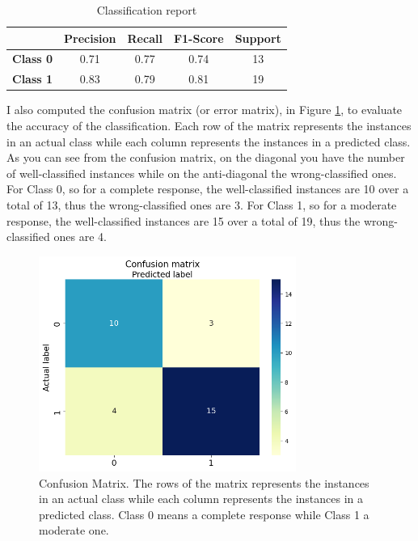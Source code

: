 \documentclass{standalone}
\begin{document}
\begin{table}[ht]
	\centering
	\begin{tabular}{ccccc}
		\toprule
		  & \textbf{Precision}  & \textbf{Recall} & \textbf{F1-Score} & \textbf{Support}\\
	    \midrule
		\textbf{Class 0} &  0.71 &  0.77 &  0.74 &  13\\
	    \midrule
		\textbf{Class 1} &  0.83 &  0.79 &  0.81 &  19\\
		\bottomrule
	\end{tabular}
	\caption{Classification report}
	\label{tab:classreport}
\end{table}

\newpage
I also computed the confusion matrix (or error matrix), in Figure \ref{confmatrix}, to evaluate the accuracy of the classification.
Each row of the matrix represents the instances in an actual class while each column represents the instances in a predicted class.
As you can see from the confusion matrix, on the diagonal you have the number of well-classified instances while on the anti-diagonal the wrong-classified ones.
For Class 0, so for a complete response, the well-classified instances are 10 over a total of 13, thus the wrong-classified ones are 3.
For Class 1, so for a moderate response, the well-classified instances are 15 over a total of 19, thus the wrong-classified ones are 4.


\begin{figure}[htp]

    \centering
    \includegraphics[width=0.75\textwidth]{../images/confmatrix.png}

    \caption{Confusion Matrix. The rows of the matrix represents the instances in an actual class while each column represents the instances in a predicted class. Class 0 means a complete response while Class 1 a moderate one. }
    \label{confmatrix}
    
\end{figure}
\end{document}
